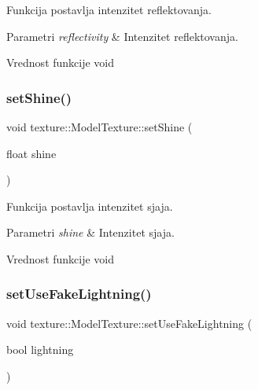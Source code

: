 Funkcija postavlja intenzitet reflektovanja. 


\begin{DoxyParams}{Parametri}
{\em reflectivity} & Intenzitet reflektovanja. \\
\hline
\end{DoxyParams}
\begin{DoxyReturn}{Vrednost funkcije}
void 
\end{DoxyReturn}
\mbox{\label{classtexture_1_1Texture_a782076c3a92f7d92cd45a92c5ef088a1}} 
\subsubsection{\texorpdfstring{set\+Shine()}{setShine()}}
{\footnotesize\ttfamily void texture\+::\+Model\+Texture\+::set\+Shine (\begin{DoxyParamCaption}\item[{float}]{shine }\end{DoxyParamCaption})}



Funkcija postavlja intenzitet sjaja. 


\begin{DoxyParams}{Parametri}
{\em shine} & Intenzitet sjaja. \\
\hline
\end{DoxyParams}
\begin{DoxyReturn}{Vrednost funkcije}
void 
\end{DoxyReturn}
\mbox{\label{classtexture_1_1Texture_a616d99807f2487d6723380ec03b57ede}} 
\subsubsection{\texorpdfstring{set\+Use\+Fake\+Lightning()}{setUseFakeLightning()}}
{\footnotesize\ttfamily void texture\+::\+Model\+Texture\+::set\+Use\+Fake\+Lightning (\begin{DoxyParamCaption}\item[{bool}]{lightning }\end{DoxyParamCaption})}



